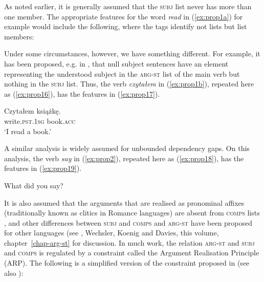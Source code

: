 \documentclass[output=paper
	        ,collection
	        ,collectionchapter
 	        ,biblatex
                ,babelshorthands
                ,newtxmath
                ,draftmode
                ,colorlinks, citecolor=brown
]{langscibook}
\begin{document}
\ea\label{ex:prop14}
\z

As noted earlier, it is generally assumed that the \textsc{subj} list never has more than one member. The appropriate features for the word \emph{read} in (\ref{ex:prop1a}) for example would include the following, where the tags identify not lists but list members:

\ea\label{ex:prop15}
\z

Under some circumstances, however, we have something different. For example, it has been proposed, e.g. in \citet[65]{ManningandSag1998}, that null subject sentences have an element representing the understood subject in the \textsc{arg-st} list of the main verb but nothing in the \textsc{subj} list. Thus, the verb \emph{czytałem} in (\ref{ex:prop1b}), repeated here as (\ref{ex:prop16}), has the features in (\ref{ex:prop17}).

\ea\label{ex:prop16}
\gll Czytałem książkę.\\
write.\textsc{pst.1sg} book.\textsc{acc}\\
\glt ‘I read a book.’

\ex\label{ex:prop17}
\z

A similar analysis is widely assumed for unbounded dependency gaps. On this analysis, the verb \emph{say} in (\ref{ex:prop2}), repeated here as (\ref{ex:prop18}), has the features in (\ref{ex:prop19}).

\ea\label{ex:prop18}
What did you say?

\ex\label{ex:prop19}
\z

It is also assumed that the arguments that are realised as pronominal affixes (traditionally known as clitics in Romance languages) are absent from \textsc{comps} lists \citep{MS97a-u,monachesi05}, and other differences between \textsc{subj} and \textsc{comps} and \textsc{arg-st} have been proposed for other languages (see \citealt{ManningandSag1998}, Wechsler, Koenig and Davies, this volume, chapter~\ref{chap-arg-st} for discussion. In much work, the relation \textsc{arg-st} and \textsc{subj} and \textsc{comps} is regulated by a constraint called the Argument Realisation Principle (ARP). The following is a simplified version of the constraint proposed in \citet[171]{GSag2000a-u} (see also \citealt[12]{BMS2001a}):
\end{document}
